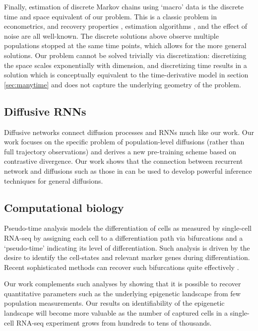 \documentclass{article}
\begin{document}
Finally, estimation of discrete Markov chains using `macro' data is the discrete time and space equivalent of our problem. This is a classic problem in econometrics, and recovery properties \citep{van1983estimation}, estimation algorithms \citep{kalbfleisch1984least}, and the effect of noise \citep{bernstein2016consistently} are all well-known. The discrete solutions above observe multiple populations stopped at the same time points, which allows for the more general solutions. Our problem cannot be solved trivially via discretization: discretizing the space scales exponentially with dimension, and discretizing time results in a solution which is conceptually equivalent to the time-derivative model in section \ref{sec:manytime} and does not capture the underlying geometry of the problem.

\subsection{Diffusive RNNs}

Diffusive networks \citep{mineiro1998learning} connect diffusion processes and RNNs much like our work. Our work focuses on the specific problem of population-level diffusions (rather than full trajectory observations) and derives a new pre-training scheme based on contrastive divergence. Our work shows that the connection between recurrent network and diffusions such as those in \citep{mineiro1998learning} can be used to develop powerful inference techniques for general diffusions.

\subsection{Computational biology}
Pseudo-time analysis \citep{trapnell2014pseudo} models the differentiation of cells as measured by single-cell RNA-seq by assigning each cell to a differentiation path via bifurcations and a `pseudo-time' indicating its level of differentiation. Such analysis is driven by the desire to identify the cell-states and relevant marker genes during differentiation. Recent sophisticated methods can recover such bifurcations quite effectively \citep{setty2016wishbone, marco2014bifurcation}.

Our work complements such analyses by showing that it is possible to recover quantitative parameters such as the underlying epigenetic landscape from few population measurements. Our results on identifiability of the epigenetic landscape will become more valuable as the number of captured cells in a single-cell RNA-seq experiment grows from hundreds \citep{klein2015droplet} to tens of thousands.
\end{document}
